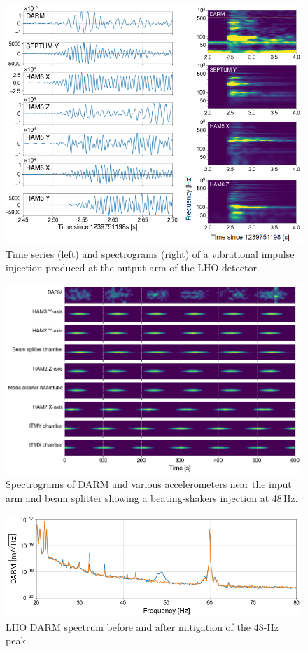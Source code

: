 \documentclass[11pt]{article}
\begin{document}
\begin{figure}[h!]
	\centering
	\includegraphics[width=\textwidth]{figures/impulse.png}
	\caption{
		Time series (left) and spectrograms (right) of a vibrational impulse injection produced at the output arm of the LHO detector.}
	\label{fig:impulse}
\end{figure}

\begin{figure}[h!]
	\centering
	\includegraphics[width=\textwidth]{figures/beat-spectrograms.png}
	\caption{
		Spectrograms of DARM and various accelerometers near the input arm and beam splitter showing a beating-shakers injection at 48\,Hz.}
	\label{fig:beats}
\end{figure}

\begin{figure}
	\centering
	\includegraphics[width=\textwidth]{figures/48Hz.png}
	\caption{LHO DARM spectrum before and after mitigation of the 48-Hz peak.}
	\label{fig:48hz}
\end{figure}
\end{document}
